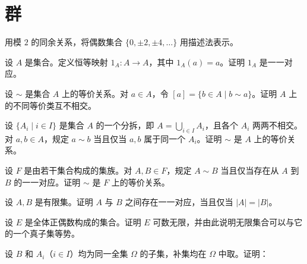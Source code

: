 \renewcommand{\thesection}{\arabic{section}}\renewcommand{\theHsection}{chapter.\arabic{section}}\setcounter{section}{0}\section{群}
\noindent\begin{minipage}{\textwidth}
用模 $2$ 的同余关系，将偶数集合 $\{0,\pm2,\pm4,\ldots\}$ 用描述法表示。
\end{minipage}\par\vfill
\noindent\begin{minipage}{\textwidth}
设 $A$ 是集合。定义恒等映射 $1_A:A\to A$，其中 $1_A(a)=a$。证明 $1_A$ 是一一对应。
\end{minipage}\par\vfill
\noindent\begin{minipage}{\textwidth}
设 $\sim$ 是集合 $A$ 上的等价关系。对 $a\in A$，令 $[a]=\{b\in A\mid b\sim a\}$。证明 $A$ 上的不同等价类互不相交。
\end{minipage}\par\vfill
\newpage
\noindent\begin{minipage}{\textwidth}
设 $\{A_i\mid i\in I\}$ 是集合 $A$ 的一个分拆，即 $A=\bigcup_{i\in I}A_i$，且各个 $A_i$ 两两不相交。对 $a,b\in A$，规定 $a\sim b$ 当且仅当 $a,b$ 属于同一个 $A_i$。证明 $\sim$ 是 $A$ 上的等价关系。
\end{minipage}\par\vfill
\noindent\begin{minipage}{\textwidth}
设 $F$ 是由若干集合构成的集族。对 $A,B\in F$，规定 $A\sim B$ 当且仅当存在从 $A$ 到 $B$ 的一一对应。证明 $\sim$ 是 $F$ 上的等价关系。
\end{minipage}\par\vfill
\noindent\begin{minipage}{\textwidth}
设 $A,B$ 是有限集。证明 $A$ 与 $B$ 之间存在一一对应，当且仅当 $|A|=|B|$。
\end{minipage}\par\vfill
\newpage
\noindent\begin{minipage}{\textwidth}
设 $E$ 是全体正偶数构成的集合。证明 $E$ 可数无限，并由此说明无限集合可以与它的一个真子集等势。
\end{minipage}\par\vfill
\noindent\begin{minipage}{\textwidth}
设 $B$ 和 $A_i$（$i\in I$）均为同一全集 $\Omega$ 的子集，补集均在 $\Omega$ 中取。证明：
\end{minipage}\par\vfill
